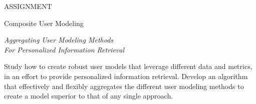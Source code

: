 \null\vspace{6em}

{
  \centering
  \color{gray}
  ASSIGNMENT
  \color{black}
  \vspace{1em}
  
  \LARGE{Composite User Modeling}\\
  \vspace{1em}
  
  \itshape
  \large{Aggregating User Modeling Methods}\\
  \large{For Personalized Information Retrieval}\\
}

\vspace{3em}

Study how to create robust user models that leverage different data and metrics,
in an effort to provide personalized information retrieval.
Develop an algorithm that effectively and flexibly aggregates the different user
modeling methods to create a model superior to that of any single approach.

\vfill
